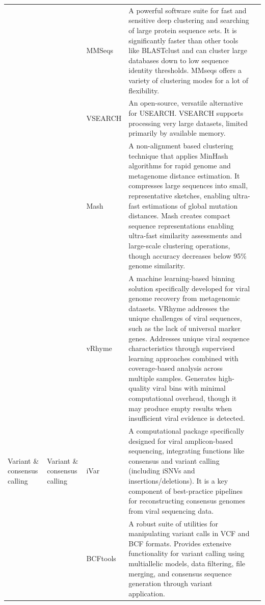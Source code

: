 \begin{longtable}{p{2cm}p{1.8cm}p{1.8cm}p{8.3cm}p{1cm}}
\cmidrule{3-5}
 &  & MMSeqs & A powerful software suite for fast and sensitive deep clustering and searching of large protein sequence sets. It is significantly faster than other tools like BLASTclust and can cluster large databases down to low sequence identity thresholds. MMseqs offers a variety of clustering modes for a lot of flexibility. & \citep{Steinegger2017-ci} \\
\cmidrule{3-5}
 &  & VSEARCH & An open-source, versatile alternative for USEARCH. VSEARCH supports processing very large datasets, limited primarily by available memory. & \citep{Rognes2016-ju} \\
\cmidrule{3-5}
 &  & Mash & A non-alignment based clustering technique that applies MinHash algorithms for rapid genome and metagenome distance estimation. It compresses large sequences into small, representative sketches, enabling ultra-fast estimations of global mutation distances. Mash creates compact sequence representations enabling ultra-fast similarity assessments and large-scale clustering operations, though accuracy decreases below 95\% genome similarity. & \citep{Ondov2019-bo} \\
\cmidrule{3-5}
 &  & vRhyme & A machine learning-based binning solution specifically developed for viral genome recovery from metagenomic datasets. VRhyme addresses the unique challenges of viral sequences, such as the lack of universal marker genes. Addresses unique viral sequence characteristics through supervised learning approaches combined with coverage-based analysis across multiple samples. Generates high-quality viral bins with minimal computational overhead, though it may produce empty results when insufficient viral evidence is detected. & \citep{Kieft2022-km} \\
\midrule

Variant \& consensus calling & Variant \& consensus calling & iVar & A computational package specifically designed for viral amplicon-based sequencing, integrating functions like consensus and variant calling (including iSNVs and insertions/deletions). It is a key component of best-practice pipelines for reconstructing consensus genomes from viral sequencing data. & \citep{Grubaugh2019-xd} \\
\cmidrule{3-5}
 &  & BCFtools & A robust suite of utilities for manipulating variant calls in VCF and BCF formats. Provides extensive functionality for variant calling using multiallelic models, data filtering, file merging, and consensus sequence generation through variant application. & \citep{Danecek2021-je} \\

\end{longtable}


